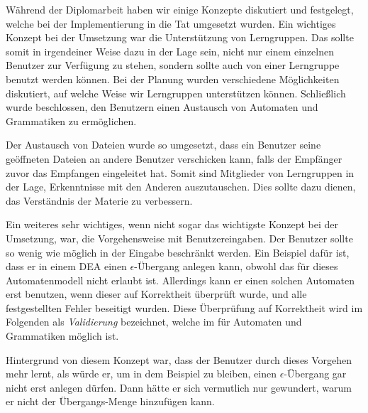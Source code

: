 Während der Diplomarbeit haben wir einige Konzepte diskutiert und festgelegt,
welche bei der Implementierung in die Tat umgesetzt wurden. Ein wichtiges Konzept
bei der Umsetzung war die Unterstützung von Lerngruppen. Das \gtitool sollte
somit in irgendeiner Weise dazu in der Lage sein, nicht nur einem einzelnen
Benutzer zur Verfügung zu stehen, sondern sollte auch von einer Lerngruppe
benutzt werden können. Bei der Planung wurden verschiedene Möglichkeiten
diskutiert, auf welche Weise wir Lerngruppen unterstützen können. Schließlich
wurde beschlossen, den Benutzern einen Austausch von Automaten und Grammatiken zu
ermöglichen.\vspace{10pt}

Der Austausch von Dateien wurde so umgesetzt, dass ein Benutzer seine geöffneten
Dateien an andere Benutzer verschicken kann, falls der Empfänger zuvor das
Empfangen eingeleitet hat. Somit sind Mitglieder von Lerngruppen in der Lage,
Erkenntnisse mit den Anderen auszutauschen. Dies sollte dazu dienen, das
Verständnis der Materie zu verbessern.\vspace{10pt}

Ein weiteres sehr wichtiges, wenn nicht sogar das wichtigste Konzept bei der
Umsetzung, war, die Vorgehensweise mit Benutzereingaben. Der Benutzer sollte so
wenig wie möglich in der Eingabe beschränkt werden. Ein Beispiel dafür ist, dass
er in einem DEA einen $\epsilon$-Übergang anlegen kann, obwohl das für dieses
Automatenmodell nicht erlaubt ist. Allerdings kann er einen solchen Automaten
erst benutzen, wenn dieser auf Korrektheit überprüft wurde, und alle
festgestellten Fehler beseitigt wurden. Diese Überprüfung auf Korrektheit wird
im Folgenden als \textit{Validierung} bezeichnet, welche im \gtitool für
Automaten und Grammatiken möglich ist.\vspace{10pt}

Hintergrund von diesem Konzept war, dass der Benutzer durch dieses Vorgehen mehr
lernt, als würde er, um in dem Beispiel zu bleiben, einen $\epsilon$-Übergang
gar nicht erst anlegen dürfen. Dann hätte er sich vermutlich nur gewundert,
warum er \Symbol{$\epsilon$} nicht der Übergangs-Menge hinzufügen
kann.\vspace{10pt}


